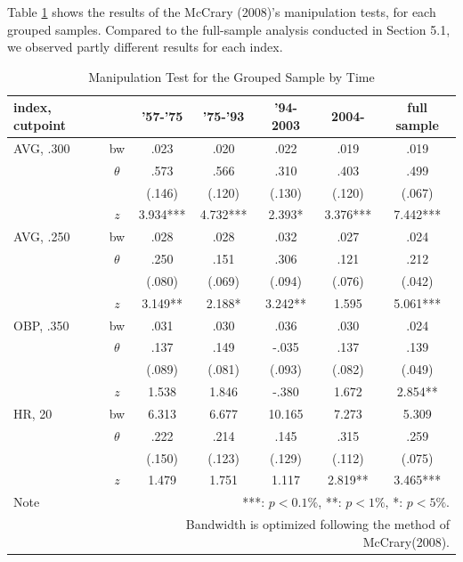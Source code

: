 \documentclass[dvipdfmx, 12pt]{article}
\begin{document}
Table \ref{Mani-Era} shows the results of the McCrary (2008)'s manipulation tests, for each grouped samples. Compared to the full-sample analysis conducted in Section 5.1, we observed partly different results for each index.



\begin{table}
  \centering
  \caption{Manipulation Test for the Grouped Sample by Time}
  \label{Mani-Era}
  \footnotesize
  \begin{tabular}{lcccccc} \hline
    index, cutpoint &  & '57-'75 &'75-'93 & '94-2003 & 2004- &full sample \\ \hline \hline
    AVG, .300 & bw & .023 & .020 & .022 & .019 & .019 \\
    & $\theta$ & .573 & .566 & .310 & .403 & .499 \\
    & & (.146) & (.120) & (.130) & (.120) & (.067) \\
    & $z$ & 3.934*** & 4.732*** & 2.393* & 3.376*** & 7.442*** \\ \hline
    AVG, .250 & bw & .028 & .028 & .032 & .027 & .024 \\
    & $\theta$ & .250 & .151 & .306 & .121 & .212 \\
    & & (.080) & (.069) & (.094)& (.076) & (.042) \\
    & $z$ & 3.149** & 2.188* & 3.242** & 1.595 & 5.061*** \\ \hline
    OBP, .350 & bw & .031 & .030 & .036 & .030 & .024 \\
    & $\theta$ & .137 & .149 & -.035 & .137 & .139 \\
    & & (.089) & (.081) & (.093) & (.082) & (.049) \\
    & $z$ & 1.538 & 1.846 & -.380 & 1.672 & 2.854** \\ \hline
    HR, 20 & bw & 6.313 & 6.677 & 10.165 & 7.273 & 5.309 \\
    & $\theta$ & .222 & .214 & .145 & .315 & .259 \\
    & & (.150) & (.123) & (.129) & (.112) & (.075) \\
    & $z$ & 1.479 & 1.751 & 1.117 & 2.819** & 3.465*** \\ \hline
    Note & \multicolumn{6}{r}{
    ***: $p<0.1\%$, **: $p<1\%$, *: $p<5\%$.
    }\\
    & \multicolumn{6}{r}{
    Bandwidth is optimized following the method of McCrary(2008).
    }
  \end{tabular}
\end{table}
\end{document}
